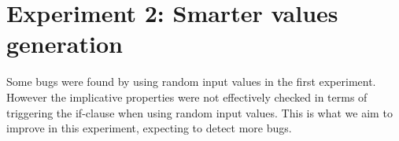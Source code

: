 \chapter{Experiment 2: Smarter values generation}
\label{cpt:experiment2}
Some bugs were found by using random input values in the first experiment. However the implicative properties were not effectively checked in terms of triggering the if-clause when using random input values. This is what we aim to improve in this experiment, expecting to detect more bugs.

